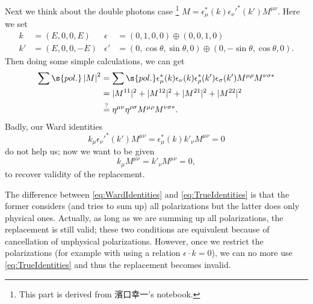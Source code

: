 Next we think about the double photons case
\footnote{This part is derived from 濱口幸一's notebook.}
$M=\epsilon_\mu^*(k)\epsilon_\nu'^*(k')M^{\mu\nu}$.
Here we set
\begin{align}
 k &=(E,0,0, E) & \epsilon &=(0,1,0,0)\oplus(0,0,1,0)\\
 k'&=(E,0,0,-E) & \epsilon'&=(0,\cos\theta,\sin\theta,0)\oplus(0,-\sin\theta,\cos\theta,0).
\end{align}
Then doing some simple calculations, we can get
\begin{align}
  \sum\s{pol.}\left|M\right|^2
&= \sum\s{pol.}\epsilon_\mu^*(k)\epsilon_\nu(k)\epsilon_\rho^*(k')\epsilon_\sigma(k')
M^{\mu\rho}M^{\nu\sigma*}\\
&= |M^{11}|^2+|M^{12}|^2+|M^{21}|^2+|M^{22}|^2\\
&\stackrel{?}{=} \Hmn\Hrs M^{\mu\rho}M^{\nu\sigma*}.
\end{align}
Badly, our Ward identities
\begin{equation}
 k_\mu\epsilon_\nu'^*(k')M^{\mu\nu} =
 \epsilon_\mu^*(k)k'_\nu M^{\mu\nu} = 0 \label{eq:WardIdentities}
\end{equation}
do not help us; now we want to be given
\begin{equation}
 k_\mu M^{\mu\nu} = k'_\nu M^{\mu\nu} = 0,\label{eq:TrueIdentities}
\end{equation}
to recover validity of the replacement.

The difference between \eqref{eq:WardIdentities} and \eqref{eq:TrueIdentities} is that the former considers (and tries to sum up) all polarizations but the latter does only physical ones.
Actually, as long as we are summing up all polarizations, the replacement is still valid; these two conditions are equivalent because of cancellation of unphysical polarizations.
However, once we restrict the polarizations (for example with using a relation $\epsilon\cdot k=0$),
we can no more use \eqref{eq:TrueIdentities} and thus the replacement becomes invalid.

